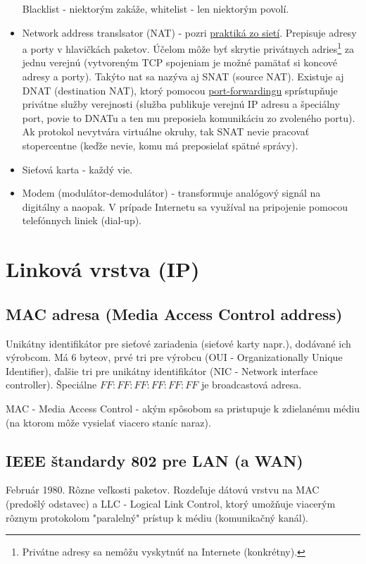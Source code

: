 \documentclass[10pt,a4paper]{article}
\begin{document}
\begin{itemize}
Blacklist - niektorým zakáže, whitelist - len niektorým povolí. 

\label{NAT}
\item Network address translsator (NAT) - pozri \href{http://netlab.dcs.fmph.uniba.sk/siete/cviko8/}{praktiká zo sietí}. Prepisuje adresy a porty v hlavičkách paketov. Účelom môže byť skrytie privátnych adries\footnote{
Privátne adresy sa nemôžu vyskytnúť na Internete (konkrétny). 
} za jednu verejnú (vytvoreným TCP spojeniam je možné pamätať si koncové adresy a porty). Takýto nat sa nazýva aj SNAT (source NAT). Existuje aj DNAT (destination NAT), ktorý pomocou \href{http://en.wikipedia.org/wiki/Port_forwarding}{port-forwardingu} sprístupňuje privátne služby verejnosti (služba publikuje verejnú IP adresu a špeciálny port, povie to DNATu a ten mu preposiela komunikáciu zo zvoleného portu). Ak protokol nevytvára virtuálne okruhy, tak SNAT nevie pracovať stopercentne (keďže nevie, komu má preposielať spätné správy).  
\item Sieťová karta - každý vie. 
\item Modem (modulátor-demodulátor) - transformuje analógový signál na digitálny a naopak. V prípade Internetu sa využíval na pripojenie pomocou telefónnych liniek (dial-up).
\end{itemize}
 
\section{Linková vrstva (IP)}        
\subsection{MAC adresa (Media Access Control address)}     
Unikátny identifikátor pre sieťové zariadenia (sieťové karty napr.),
dodávané ich výrobcom. Má 6 byteov, prvé tri pre výrobcu (OUI - Organizationally Unique Identifier), ďalšie tri pre unikátny identifikátor (NIC - Network interface controller). Špeciálne $FF:FF:FF:FF:FF:FF$ je broadcastová adresa. 
          
MAC -  Media Access Control - akým spôsobom sa pristupuje k zdielanému médiu (na ktorom môže vysielať viacero staníc naraz).          
\subsection{IEEE štandardy 802 pre LAN (a WAN)}  
Február 1980. Rôzne veľkosti paketov. Rozdeľuje dátovú vrstvu na MAC  (predošlý odstavec) a LLC - Logical Link Control, ktorý umožňuje viacerým rôznym protokolom "paralelný" prístup k médiu (komunikačný kanál).
\end{document}
